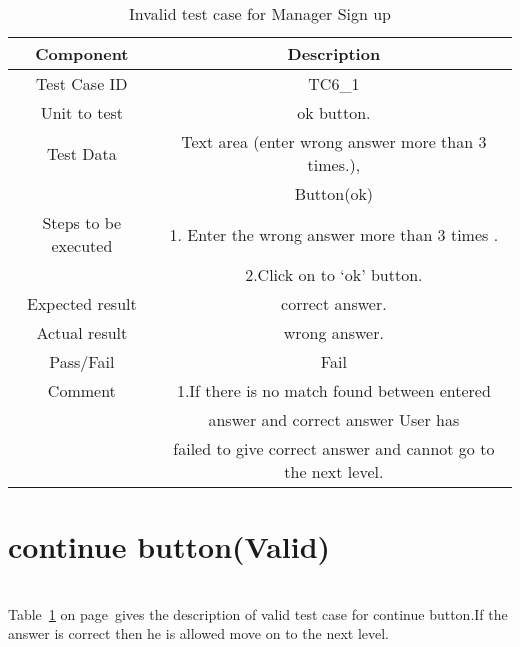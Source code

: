\begin{table}[htb!]
\label{table :tc11}
\centering %
\begin{tabular}{c c} %
\hline\hline %
 Component & Description \\ [0.5ex] %
\hline %
Test Case ID & TC6\_1   \\
Unit to test &ok button. \\ 
Test Data &Text area (enter wrong answer more than 3 times.),\\
&Button(ok)\\
Steps to be executed &1. Enter the wrong answer more than 3 times .\\
&2.Click on to ‘ok’ button.\\
Expected result  &correct answer.\\ 
Actual result &wrong answer.\\
Pass/Fail &Fail\\
Comment &1.If there is no match found between entered\\
& answer and correct answer   User has\\
& failed to give correct answer and  cannot go to the next level.\\

\hline %
\end{tabular}
\caption{Invalid test case for Manager Sign up} \label{table:tc11} %
\end{table}

\section{continue button(Valid)}
\hspace{1cm} \\
Table~\ref{table:tc11} on
page~\pageref{table:tc11}gives the description of valid test case for continue button.If  the answer is correct then he is allowed move on to the next level.\\

